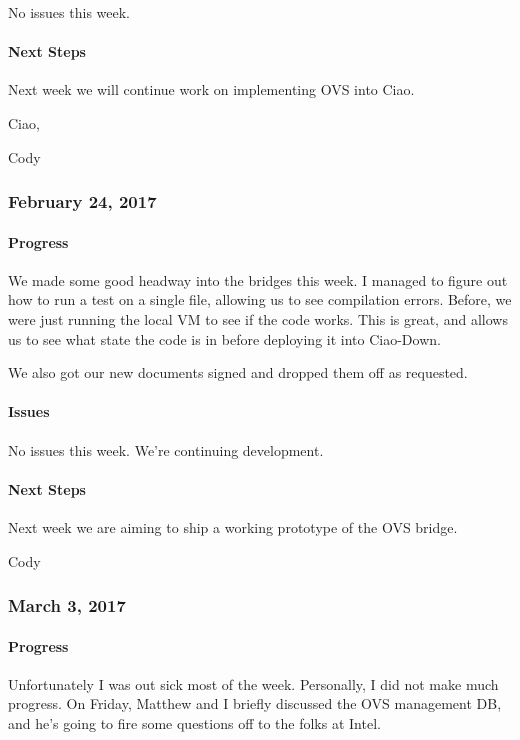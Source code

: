 \documentclass[10pt,onecolumn,journal,draftclsnofoot]{IEEEtran}
\begin{document}
No issues this week.

\paragraph{Next Steps} 

Next week we will continue work on implementing OVS into Ciao.

Ciao,

Cody

\subsubsection{February 24, 2017} 

\paragraph{Progress} 

We made some good headway into the bridges this week. I managed to
figure out how to run a test on a single file, allowing us to see
compilation errors. Before, we were just running the local VM to see if
the code works. This is great, and allows us to see what state the code
is in before deploying it into Ciao-Down.

We also got our new documents signed and dropped them off as requested.

\paragraph{Issues} 

No issues this week. We're continuing development.

\paragraph{Next Steps} 

Next week we are aiming to ship a working prototype of the OVS bridge.

Cody

\subsubsection{March 3, 2017} 

\paragraph{Progress} 

Unfortunately I was out sick most of the week. Personally, I did not
make much progress. On Friday, Matthew and I briefly discussed the OVS
management DB, and he's going to fire some questions off to the folks at
Intel.
\end{document}
